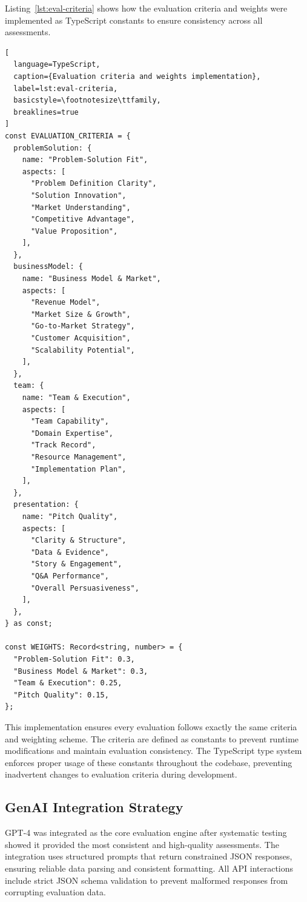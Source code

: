 Listing~\ref{lst:eval-criteria} shows how the evaluation criteria and weights were implemented as TypeScript constants to ensure consistency across all assessments.

\begin{lstlisting}[
  language=TypeScript,
  caption={Evaluation criteria and weights implementation},
  label=lst:eval-criteria,
  basicstyle=\footnotesize\ttfamily,
  breaklines=true
]
const EVALUATION_CRITERIA = {
  problemSolution: {
    name: "Problem-Solution Fit",
    aspects: [
      "Problem Definition Clarity",
      "Solution Innovation",
      "Market Understanding",
      "Competitive Advantage",
      "Value Proposition",
    ],
  },
  businessModel: {
    name: "Business Model & Market",
    aspects: [
      "Revenue Model",
      "Market Size & Growth",
      "Go-to-Market Strategy",
      "Customer Acquisition",
      "Scalability Potential",
    ],
  },
  team: {
    name: "Team & Execution",
    aspects: [
      "Team Capability",
      "Domain Expertise",
      "Track Record",
      "Resource Management",
      "Implementation Plan",
    ],
  },
  presentation: {
    name: "Pitch Quality",
    aspects: [
      "Clarity & Structure",
      "Data & Evidence",
      "Story & Engagement",
      "Q&A Performance",
      "Overall Persuasiveness",
    ],
  },
} as const;

const WEIGHTS: Record<string, number> = {
  "Problem-Solution Fit": 0.3,
  "Business Model & Market": 0.3,
  "Team & Execution": 0.25,
  "Pitch Quality": 0.15,
};
\end{lstlisting}

This implementation ensures every evaluation follows exactly the same criteria and weighting scheme. The criteria are defined as constants to prevent runtime modifications and maintain evaluation consistency. The TypeScript type system enforces proper usage of these constants throughout the codebase, preventing inadvertent changes to evaluation criteria during development.

\subsection{GenAI Integration Strategy}\label{subsec:genai-integration-strategy}

GPT-4 was integrated as the core evaluation engine after systematic testing showed it provided the most consistent and high-quality assessments. The integration uses structured prompts that return constrained JSON responses, ensuring reliable data parsing and consistent formatting. All API interactions include strict JSON schema validation to prevent malformed responses from corrupting evaluation data.

